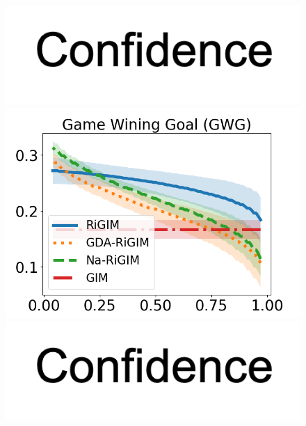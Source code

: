 \documentclass[letterpaper]{article} %
\begin{document}
\begin{figure}[htbp]
\begin{minipage}{0.16\textwidth}
    \vspace{-0.05in}
    \includegraphics[scale=0.12]{figures/confidence_x_label.png}
    \end{minipage}
    \begin{minipage}{0.16\textwidth}
    \centering
    \includegraphics[scale=0.16]{figures/risk_curve_GWG_shadow.png}\par
    \vspace{-0.05in}
    \includegraphics[scale=0.12]{figures/confidence_x_label.png}
    \end{minipage}
    \begin{minipage}{0.16\textwidth}
    \centering

\end{minipage}
\end{figure}
\end{document}
